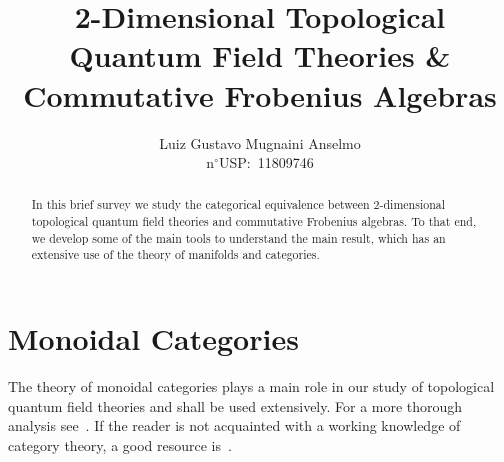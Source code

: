 \documentclass[11pt, reqno]{amsart}
\author{Luiz Gustavo Mugnaini Anselmo \\ n\(^{\circ}\)USP:~11809746}
\title{
  2-Dimensional Topological Quantum Field Theories \& Commutative Frobenius
  Algebras
}
\theoremstyle{definition}
\begin{document}
\maketitle

\begin{abstract}
In this brief survey we study the categorical equivalence between
\(2\)-dimensional topological quantum field theories and commutative Frobenius
algebras. To that end, we develop some of the main tools to understand the main
result, which has an extensive use of the theory of manifolds and categories.
\end{abstract}

\section{Monoidal Categories}

The theory of monoidal categories plays a main role in our study of topological
quantum field theories and shall be used extensively. For a more thorough analysis
see~\cite{etingof}. If the reader is not acquainted with a working knowledge of
category theory, a good resource is~\cite{borceux}.
\end{document}
